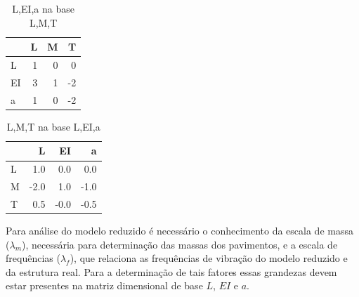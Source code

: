     
    \begin{table}[H]
    \centering
    \caption{L,EI,a na base L,M,T}
    {\begin{tabular}{lrrr}
\toprule
{} &  L &  M &  T \\
\midrule
L  &  1 &  0 &  0 \\
EI &  3 &  1 & -2 \\
a  &  1 &  0 & -2 \\
\bottomrule
\end{tabular}
}
    \label{}
    \end{table}
    

    
    
    \begin{table}[H]
    \centering
    \caption{L,M,T na base L,EI,a}
    {\begin{tabular}{lrrr}
\toprule
{} &    L &   EI &    a \\
\midrule
L &  1.0 &  0.0 &  0.0 \\
M & -2.0 &  1.0 & -1.0 \\
T &  0.5 & -0.0 & -0.5 \\
\bottomrule
\end{tabular}
}
    \label{}
    \end{table}
    

    
    Para análise do modelo reduzido é necessário o conhecimento da escala de
massa (\(\lambda_m\)), necessária para determinação das massas dos
pavimentos, e a escala de frequências (\(\lambda_f\)), que relaciona as
frequências de vibração do modelo reduzido e da estrutura real. Para a
determinação de tais fatores essas grandezas devem estar presentes na
matriz dimensional de base \(L\), \(EI\) e \(a\).

